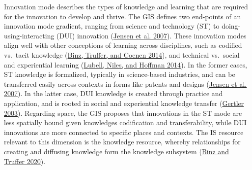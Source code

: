\documentclass[twoside,12pt,final]{ucthesis-CA2012}
\begin{document}
\begin{ucmainmatter}
Innovation mode describes the types of knowledge and learning that are
required for the innovation to develop and thrive. The GIS defines two
end-points of an innovation mode gradient, ranging from \textquotesingle science and
technology\textquotesingle{} (ST) to \textquotesingle doing-using-interacting\textquotesingle{} (DUI) innovation
(\protect\hyperlink{ref-Jensen_Johnson_Lorenz_Lundvall_2007}{Jensen et al. 2007}).
These innovation modes align well with other conceptions of learning
across disciplines, such as codified vs.~tacit knowledge
(\protect\hyperlink{ref-Binz_Truffer_Coenen_2014}{Binz, Truffer, and Coenen 2014}),
and technical vs.~social and experiential learning
(\protect\hyperlink{ref-Lubell_Niles_Hoffman_2014}{Lubell, Niles, and Hoffman 2014}).
In the former cases, ST knowledge is formalized, typically in
science-based industries, and can be transferred easily across contexts
in forms like patents and designs
(\protect\hyperlink{ref-Jensen_Johnson_Lorenz_Lundvall_2007}{Jensen et al. 2007}).
In the latter case, DUI knowledge is created through practice and
application, and is rooted in social and experiential knowledge transfer
(\protect\hyperlink{ref-Gertler_2003}{Gertler 2003}). Regarding
space, the GIS proposes that innovations in the ST mode are less
spatially bound given knowledge\textquotesingle s codification and transferability,
while DUI innovations are more connected to specific places and
contexts. The IS resource relevant to this dimension is the knowledge
resource, whereby relationships for creating and diffusing knowledge
form the knowledge subsystem
(\protect\hyperlink{ref-Binz_Truffer_2020}{Binz and Truffer 2020}).


\end{ucmainmatter}
\end{document}
